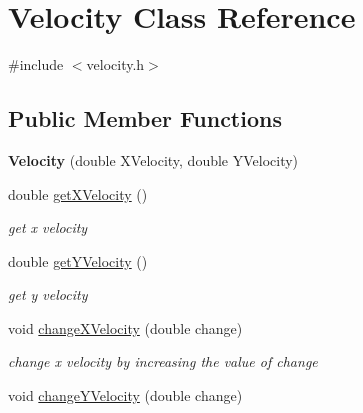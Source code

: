 \hypertarget{class_velocity}{}\section{Velocity Class Reference}
\label{class_velocity}


{\ttfamily \#include $<$velocity.\+h$>$}

\subsection*{Public Member Functions}
\begin{DoxyCompactItemize}
\item 
\mbox{\label{class_velocity_ac7bb529bf5effe33ef79aef8acf34cc6}} 
{\bfseries Velocity} (double X\+Velocity, double Y\+Velocity)
\item 
\mbox{\label{class_velocity_a38abeebec5b97d4f230c2a8995270621}} 
double \mbox{\hyperlink{class_velocity_a38abeebec5b97d4f230c2a8995270621}{get\+X\+Velocity}} ()
\begin{DoxyCompactList}\small\item\em get x velocity \end{DoxyCompactList}\item 
\mbox{\label{class_velocity_a8318a85dc6732c0b896584df7be56775}} 
double \mbox{\hyperlink{class_velocity_a8318a85dc6732c0b896584df7be56775}{get\+Y\+Velocity}} ()
\begin{DoxyCompactList}\small\item\em get y velocity \end{DoxyCompactList}\item 
\mbox{\label{class_velocity_a441b45e36202610da088565d29d2bf88}} 
void \mbox{\hyperlink{class_velocity_a441b45e36202610da088565d29d2bf88}{change\+X\+Velocity}} (double change)
\begin{DoxyCompactList}\small\item\em change x velocity by increasing the value of change \end{DoxyCompactList}\item 
\mbox{\label{class_velocity_a961a18e13d28c193049ab33a5b0a19b5}} 
void \mbox{\hyperlink{class_velocity_a961a18e13d28c193049ab33a5b0a19b5}{change\+Y\+Velocity}} (double change)

\end{DoxyCompactItemize}
